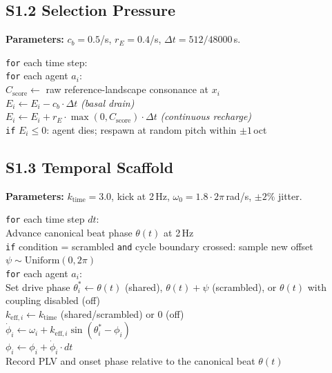 \documentclass[letterpaper]{article}
\begin{document}
\subsection{S1.2 Selection Pressure}

\noindent\textbf{Parameters:} $c_b\!=\!0.5$/s, $r_E\!=\!0.4$/s, $\Delta t = 512/48000$\,s.

\smallskip
\noindent\texttt{for} each time step:\\
\hspace*{1em}\texttt{for} each agent $a_i$:\\
\hspace*{2em}$C_{\text{score}} \gets$ raw reference-landscape consonance at $x_i$\\
\hspace*{2em}$E_i \gets E_i - c_b \cdot \Delta t$ \hfill\textit{(basal drain)}\\
\hspace*{2em}$E_i \gets E_i + r_E \cdot \max(0, C_{\text{score}}) \cdot \Delta t$ \hfill\textit{(continuous recharge)}\\
\hspace*{2em}\texttt{if} $E_i \leq 0$: agent dies; respawn at random pitch within $\pm 1$\,oct

\subsection{S1.3 Temporal Scaffold}

\noindent\textbf{Parameters:} $k_{\text{time}}\!=\!3.0$, kick at 2\,Hz, $\omega_0\!=\!1.8\!\cdot\!2\pi$\,rad/s, $\pm 2\%$ jitter.

\smallskip
\noindent\texttt{for} each time step $dt$:\\
\hspace*{1em}Advance canonical beat phase $\theta(t)$ at 2\,Hz\\
\hspace*{1em}\texttt{if} condition = scrambled \texttt{and} cycle boundary crossed: sample new offset $\psi \sim \mathrm{Uniform}(0,2\pi)$\\
\hspace*{1em}\texttt{for} each agent $a_i$:\\
\hspace*{2em}Set drive phase $\theta_i^{\ast} \gets \theta(t)$ (shared), $\theta(t)+\psi$ (scrambled), or $\theta(t)$ with coupling disabled (off)\\
\hspace*{2em}$k_{\text{eff},i} \gets k_{\text{time}}$ (shared/scrambled) or $0$ (off)\\
\hspace*{2em}$\dot{\phi}_i \gets \omega_i + k_{\text{eff},i}\sin(\theta_i^{\ast} - \phi_i)$\\
\hspace*{2em}$\phi_i \gets \phi_i + \dot{\phi}_i \cdot dt$\\
\hspace*{1em}Record PLV and onset phase relative to the canonical beat $\theta(t)$
\end{document}
